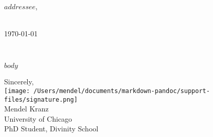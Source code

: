 \documentclass{letter}
\def\opening#1{\thispagestyle{empty}
{\centering\fromaddress \vspace{0.6in} \\ %
\today\hspace*{\fill}\par} %
{\raggedright \toname \\ \toaddress \par} %
\noindent #1 %
}
\begin{document}

\begin{letter}{{$addressee$},}


\vspace{-5\parskip}\opening{}
 
$body$

\vspace{2\parskip} %


\closing{Sincerely,\\\texttt{[image: /Users/mendel/documents/markdown-pandoc/support-files/signature.png]}\\Mendel Kranz\\University of Chicago\\PhD Student, Divinity School}





\end{letter}
 
\end{document}
